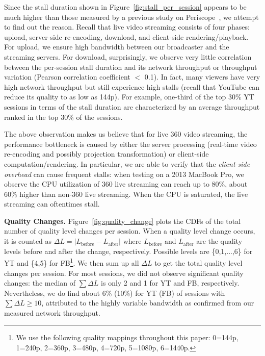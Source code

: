 Since the stall duration shown in Figure~\ref{fig:stall_per_session} appears to be much higher than those measured by a previous study on Periscope~\cite{siekkinen16}, we attempt to find out the reason. Recall that live video streaming consists of four phases: upload, server-side re-encoding, download, and client-side rendering/playback.
For upload, we ensure high bandwidth between our broadcaster and the streaming servers.
For download, surprisingly, we observe very little correlation between
the per-session stall duration and its network throughput or throughput variation
(Pearson correlation coefficient $<$ 0.1). In fact, many viewers have very high network throughput but still experience high stalls (recall that YouTube can reduce its quality to as low as 144p). For example, one-third of the top 30\% YT sessions in terms of the stall duration are characterized by an average throughput ranked in the top 30\% of the sessions.

The above observation makes us believe that for live 360\degree{} video streaming, the performance bottleneck is caused by either the server processing (real-time video re-encoding and possibly projection transformation) or client-side computation/rendering.
%
In particular, we are able to verify that the \emph{client-side overhead} can cause frequent stalls:
when testing on a 2013 MacBook Pro, we observe the CPU utilization of 360\degree{} live streaming can reach up to 80\%, about 60\% higher than non-360\degree{} live streaming. When the CPU is saturated, the live streaming can oftentimes stall.


\BULLET \textbf{Quality Changes.} Figure~\ref{fig:quality_change} plots the CDFs of the total number of quality level changes per session. When a quality level change occurs, it is counted as $\Delta L = |L_\text{before} - L_\text{after}|$ where $L_\text{before}$ and $L_\text{after}$ are the quality levels before and after the change, respectively. Possible levels are \{0,1,...,6\} for YT and \{4,5\} for FB\footnote{We use the following quality mappings throughout this paper: 0=144p, 1=240p, 2=360p, 3=480p, 4=720p, 5=1080p, 6=1440p.}. We then sum up all $\Delta L$ to get the total quality level changes per session.
%
For most sessions, we did not observe significant quality changes: the median of $\sum\Delta L$ is only 2 and 1 for YT and FB, respectively.
Nevertheless, we do find about 6\% (10\%) for YT (FB) of sessions with $\sum\Delta L \ge 10$, attributed to the highly variable bandwidth as confirmed from our measured network throughput.



